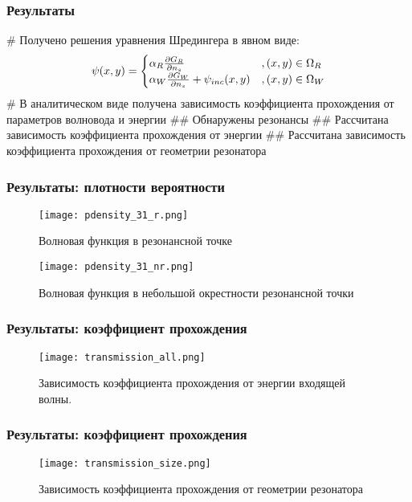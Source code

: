\documentclass{beamer}
\begin{document}
\begin{frame}[fragile]
\frametitle{Результаты}
\begin{easylist}[itemize]
# Получено решения уравнения Шредингера в явном виде:
\[
\psi(x, y) =
\begin{cases}
\alpha_R \pdv{G_R}{n_s} (x, y, x_0, y_0; k) &, (x, y) \in \Omega_R \\
\alpha_W \pdv{G_W}{n_s} (x, y, x_0, y_0; k) + \psi_{inc}(x, y) &, (x, y) \in \Omega_W  
\end{cases}
\]
# В аналитическом виде получена зависимость коэффициента прохождения от параметров волновода и энергии
## Обнаружены резонансы
## Рассчитана зависимость коэффициента прохождения от энергии
## Рассчитана зависимость коэффициента прохождения от геометрии резонатора
\end{easylist}
\end{frame}

\begin{frame}[fragile]
\frametitle{Результаты: плотности вероятности}
\begin{figure}
\texttt{[image: pdensity\_31\_r.png]}
\caption{Волновая функция в резонансной точке}
\end{figure}
\begin{figure}
\texttt{[image: pdensity\_31\_nr.png]}
\caption{Волновая функция в небольшой окрестности резонансной точки}
\end{figure}
\end{frame}


\begin{frame}[fragile]
\frametitle{Результаты: коэффициент прохождения}
\begin{figure}
\texttt{[image: transmission\_all.png]}
\caption{Зависимость коэффициента прохождения от энергии входящей волны.}
\end{figure}
\end{frame}

\begin{frame}[fragile]
\frametitle{Результаты: коэффициент прохождения}
\begin{figure}
\texttt{[image: transmission\_size.png]}
\caption{Зависимость коэффициента прохождения от геометрии резонатора}
\end{figure}
\end{frame}


\end{document}
